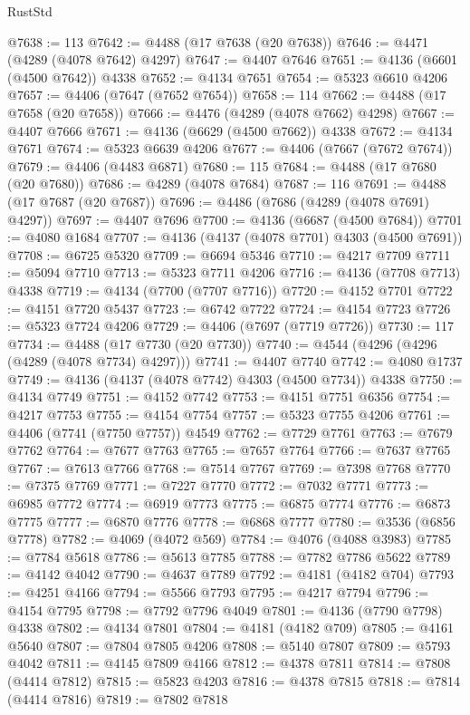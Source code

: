 \begin{lexlean}{RustStd}
\begin{coremodule}
{\begin{coremodule}
{{{{{{{{{{{{{{{{{{{{{{{{{{{{{{{{{{{{{{{{{{{{{{{{{{@7638 := 113
@7642 := @4488 (@17 @7638 (@20 @7638))
@7646 := @4471 (@4289 (@4078 @7642) @4297)
@7647 := @4407 @7646
@7651 := @4136 (@6601 (@4500 @7642)) @4338
@7652 := @4134 @7651
@7654 := @5323 @6610 @4206
@7657 := @4406 (@7647 (@7652 @7654))
@7658 := 114
@7662 := @4488 (@17 @7658 (@20 @7658))
@7666 := @4476 (@4289 (@4078 @7662) @4298)
@7667 := @4407 @7666
@7671 := @4136 (@6629 (@4500 @7662)) @4338
@7672 := @4134 @7671
@7674 := @5323 @6639 @4206
@7677 := @4406 (@7667 (@7672 @7674))
@7679 := @4406 (@4483 @6871)
@7680 := 115
@7684 := @4488 (@17 @7680 (@20 @7680))
@7686 := @4289 (@4078 @7684)
@7687 := 116
@7691 := @4488 (@17 @7687 (@20 @7687))
@7696 := @4486 (@7686 (@4289 (@4078 @7691) @4297))
@7697 := @4407 @7696
@7700 := @4136 (@6687 (@4500 @7684))
@7701 := @4080 @1684
@7707 := @4136 (@4137 (@4078 @7701) @4303 (@4500 @7691))
@7708 := @6725 @5320
@7709 := @6694 @5346
@7710 := @4217 @7709
@7711 := @5094 @7710
@7713 := @5323 @7711 @4206
@7716 := @4136 (@7708 @7713) @4338
@7719 := @4134 (@7700 (@7707 @7716))
@7720 := @4152 @7701
@7722 := @4151 @7720 @5437
@7723 := @6742 @7722
@7724 := @4154 @7723
@7726 := @5323 @7724 @4206
@7729 := @4406 (@7697 (@7719 @7726))
@7730 := 117
@7734 := @4488 (@17 @7730 (@20 @7730))
@7740 := @4544 (@4296 (@4296 (@4289 (@4078 @7734) @4297)))
@7741 := @4407 @7740
@7742 := @4080 @1737
@7749 := @4136 (@4137 (@4078 @7742) @4303 (@4500 @7734)) @4338
@7750 := @4134 @7749
@7751 := @4152 @7742
@7753 := @4151 @7751 @6356
@7754 := @4217 @7753
@7755 := @4154 @7754
@7757 := @5323 @7755 @4206
@7761 := @4406 (@7741 (@7750 @7757)) @4549
@7762 := @7729 @7761
@7763 := @7679 @7762
@7764 := @7677 @7763
@7765 := @7657 @7764
@7766 := @7637 @7765
@7767 := @7613 @7766
@7768 := @7514 @7767
@7769 := @7398 @7768
@7770 := @7375 @7769
@7771 := @7227 @7770
@7772 := @7032 @7771
@7773 := @6985 @7772
@7774 := @6919 @7773
@7775 := @6875 @7774
@7776 := @6873 @7775
@7777 := @6870 @7776
@7778 := @6868 @7777
@7780 := @3536 (@6856 @7778)
@7782 := @4069 (@4072 @569)
@7784 := @4076 (@4088 @3983)
@7785 := @7784 @5618
@7786 := @5613 @7785
@7788 := @7782 @7786 @5622
@7789 := @4142 @4042
@7790 := @4637 @7789
@7792 := @4181 (@4182 @704)
@7793 := @4251 @4166
@7794 := @5566 @7793
@7795 := @4217 @7794
@7796 := @4154 @7795
@7798 := @7792 @7796 @4049
@7801 := @4136 (@7790 @7798) @4338
@7802 := @4134 @7801
@7804 := @4181 (@4182 @709)
@7805 := @4161 @5640
@7807 := @7804 @7805 @4206
@7808 := @5140 @7807
@7809 := @5793 @4042
@7811 := @4145 @7809 @4166
@7812 := @4378 @7811
@7814 := @7808 (@4414 @7812)
@7815 := @5823 @4203
@7816 := @4378 @7815
@7818 := @7814 (@4414 @7816)
@7819 := @7802 @7818
}}}}}}}}}}}}}}}}}}}}}}}}}}}}}}}}}}}}}}}}}}}}}}}}}}
\end{coremodule}}
\end{coremodule}
\end{lexlean}
